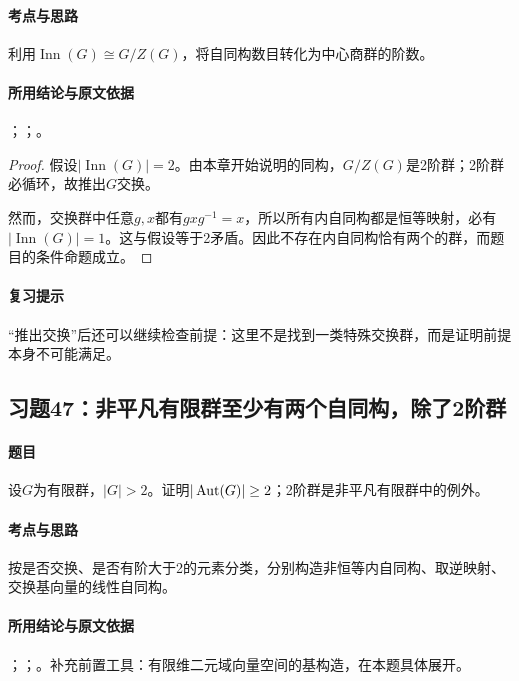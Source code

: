 \paragraph{考点与思路}
利用$\operatorname{Inn}(G)\cong G/Z(G)$，将自同构数目转化为中心商群的阶数。

\paragraph{所用结论与原文依据}
；；。


\begin{proof}
假设$|\operatorname{Inn}(G)|=2$。由本章开始说明的同构，$G/Z(G)$是2阶群；2阶群必循环，故推出$G$交换。

然而，交换群中任意$g,x$都有$gxg^{-1}=x$，所以所有内自同构都是恒等映射，必有$|\operatorname{Inn}(G)|=1$。这与假设等于2矛盾。因此不存在内自同构恰有两个的群，而题目的条件命题成立。
\end{proof}

\paragraph{复习提示}
“推出交换”后还可以继续检查前提：这里不是找到一类特殊交换群，而是证明前提本身不可能满足。


\subsection{习题47：\texorpdfstring{非平凡有限群至少有两个自同构，除了2阶群}{非平凡有限群至少有两个自同构，除了2阶群}}
\label{ex:2:47}

\paragraph{题目}
设$G$为有限群，$|G|>2$。证明$|\operatorname{Aut}(G)|\ge2$；2阶群是非平凡有限群中的例外。

\paragraph{考点与思路}
按是否交换、是否有阶大于2的元素分类，分别构造非恒等内自同构、取逆映射、交换基向量的线性自同构。

\paragraph{所用结论与原文依据}
；；。补充前置工具：有限维二元域向量空间的基构造，在本题具体展开。


